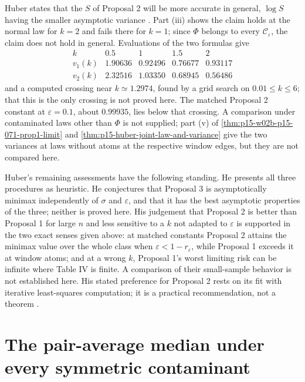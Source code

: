 Huber states that the \(S\) of Proposal 2 will be more accurate in
general, \(\log S\) having the smaller asymptotic variance
\cite[p.~96]{Huber1964RobustLocation}. Part (iii) shows the claim
holds at the normal law for \(k=2\) and fails there for \(k=1\); since
\(\Phi\) belongs to every \(\mathcal C_\varepsilon\), the claim does not
hold in general. Evaluations of the two formulas give
\[
\begin{array}{c|rrrr}
k&0.5&1&1.5&2\\\hline
v_1(k)&1.90636&0.92496&0.76677&0.93117\\
v_2(k)&2.32516&1.03350&0.68945&0.56486
\end{array}
\]
and a computed crossing near \(k\simeq1.2974\), found by a grid search on
\(0.01\leq k\leq6\); that this is the only crossing is not proved here.
The matched Proposal 2 constant at \(\varepsilon=0.1\), about \(0.99935\),
lies below that crossing. A comparison under contaminated laws other
than \(\Phi\) is not supplied; part (v) of
\cref{thm:p15-w02b-p15-071-prop1-limit} and
\cref{thm:p15-huber-joint-law-and-variance} give the two variances at
laws without atoms at the respective window edges, but they are not
compared here.

Huber's remaining assessments have the following standing. He presents
all three procedures as heuristic. He conjectures that Proposal 3 is
asymptotically minimax independently of \(\sigma\) and \(\varepsilon\),
and that it has the best asymptotic properties of the three; neither is
proved here. His judgement that Proposal 2 is better than Proposal 1
for large \(n\) and less sensitive to a \(k\) not adapted to
\(\varepsilon\) is supported in the two exact senses given above: at
matched constants Proposal 2 attains the minimax value over the whole
class when \(\varepsilon<1-r_\varepsilon\), while Proposal 1 exceeds it at
window atoms; and at a wrong \(k\), Proposal 1's worst limiting risk can
be infinite where Table IV is finite. A comparison of their small-sample
behavior is not established here. His stated preference for Proposal 2
rests on its fit with iterative least-squares computation; it is a
practical recommendation, not a theorem
\cite[pp.~96--97]{Huber1964RobustLocation}.

\section{The pair-average median under every symmetric contaminant}
\label{sec:p15-w02b-p15-071-pair-median}

